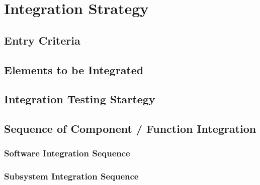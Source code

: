 \chapter{Integration Strategy} \label{chap2}

\section{Entry Criteria}

\section{Elements to be Integrated}

\section{Integration Testing Startegy}

\section{Sequence of Component / Function Integration}

\subsection{Software Integration Sequence}

\subsection{Subsystem Integration Sequence}
